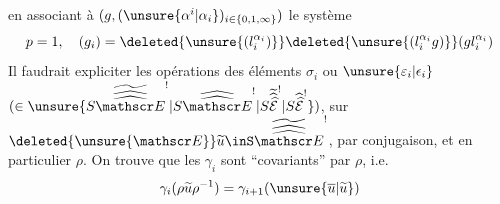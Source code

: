  en associant à $(g,(\unsure{\alpha^i|\alpha_i})_{i\in\{0,1,\infty\}})$ le système 
\[
p=1,\quad(g_i)=\deleted{\unsure{(l_i^{\alpha_i})}}\deleted{\unsure{(l_i^{\alpha_i}g)}}(gl_i^{\alpha_i})
\]
Il faudrait expliciter les opérations des éléments $\sigma_i$ ou $\unsure{\varepsilon_i|\epsilon_i}$  $(\in\unsure{S\widetilde{\widehat{\widehat{\mathscr E}}}^{!}|S\widehat{\widehat{\mathscr E}}^{!}|S\widetilde{\widehat{\widehat{\mathcal E}}}^{!}|S\widehat{\widehat{\mathcal E}}^{!}})$, sur $\deleted{\unsure{\mathscr E}}\widetilde u\inS\widetilde{\widehat{\widehat{\mathscr E}}}^{!}$,  par conjugaison, et en particulier $\rho$. On trouve que  les $\gamma_i$ sont ``covariants'' par $\rho$, i.e.
\[
\gamma_i(\rho\widetilde u\rho^{-1})=\gamma_{i+1}(\unsure{\overline u|\widetilde u})
\]
